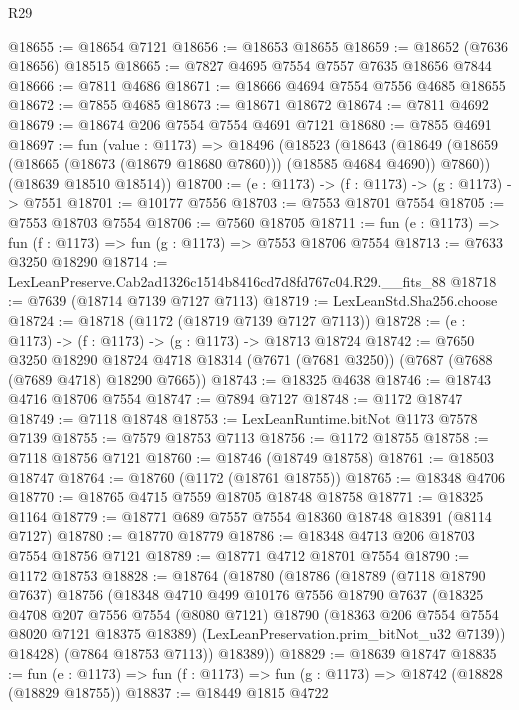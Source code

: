 \begin{lexlean}{R29}
\begin{coremodule}
@18655 := @18654 @7121
@18656 := @18653 @18655
@18659 := @18652 (@7636 @18656) @18515
@18665 := @7827 @4695 @7554 @7557 @7635 @18656 @7844
@18666 := @7811 @4686
@18671 := @18666 @4694 @7554 @7556 @4685 @18655
@18672 := @7855 @4685
@18673 := @18671 @18672
@18674 := @7811 @4692
@18679 := @18674 @206 @7554 @7554 @4691 @7121
@18680 := @7855 @4691
@18697 := fun (value : @1173) =>
  @18496
    (@18523
      (@18643 (@18649 (@18659 (@18665 (@18673 (@18679 @18680 @7860))) (@18585 @4684 @4690)) @7860))
      (@18639 @18510 @18514))
@18700 := (e : @1173) -> (f : @1173) -> (g : @1173) -> @7551
@18701 := @10177 @7556
@18703 := @7553 @18701 @7554
@18705 := @7553 @18703 @7554
@18706 := @7560 @18705
@18711 := fun (e : @1173) => fun (f : @1173) => fun (g : @1173) => @7553 @18706 @7554
@18713 := @7633 @3250 @18290
@18714 := LexLeanPreserve.Cab2ad1326c1514b8416cd7d8fd767c04.R29.__fits_88
@18718 := @7639 (@18714 @7139 @7127 @7113)
@18719 := LexLeanStd.Sha256.choose
@18724 := @18718 (@1172 (@18719 @7139 @7127 @7113))
@18728 := (e : @1173) -> (f : @1173) -> (g : @1173) -> @18713 @18724
@18742 := @7650
    @3250
    @18290
    @18724
    @4718
    @18314
    (@7671 (@7681 @3250))
    (@7687 (@7688 (@7689 @4718) @18290 @7665))
@18743 := @18325 @4638
@18746 := @18743 @4716 @18706 @7554
@18747 := @7894 @7127
@18748 := @1172 @18747
@18749 := @7118 @18748
@18753 := LexLeanRuntime.bitNot @1173 @7578 @7139
@18755 := @7579 @18753 @7113
@18756 := @1172 @18755
@18758 := @7118 @18756 @7121
@18760 := @18746 (@18749 @18758)
@18761 := @18503 @18747
@18764 := @18760 (@1172 (@18761 @18755))
@18765 := @18348 @4706
@18770 := @18765 @4715 @7559 @18705 @18748 @18758
@18771 := @18325 @1164
@18779 := @18771 @689 @7557 @7554 @18360 @18748 @18391 (@8114 @7127)
@18780 := @18770 @18779
@18786 := @18348 @4713 @206 @18703 @7554 @18756 @7121
@18789 := @18771 @4712 @18701 @7554
@18790 := @1172 @18753
@18828 := @18764
    (@18780
      (@18786
        (@18789
          (@7118 @18790 @7637)
          @18756
          (@18348
            @4710
            @499
            @10176
            @7556
            @18790
            @7637
            (@18325
              @4708
              @207
              @7556
              @7554
              (@8080 @7121)
              @18790
              (@18363 @206 @7554 @7554 @8020 @7121 @18375 @18389)
              (LexLeanPreservation.prim_bitNot_u32 @7139))
            @18428)
          (@7864 @18753 @7113))
        @18389))
@18829 := @18639 @18747
@18835 := fun (e : @1173) => fun (f : @1173) => fun (g : @1173) => @18742 (@18828 (@18829 @18755))
@18837 := @18449 @1815 @4722

\end{coremodule}
\end{lexlean}
